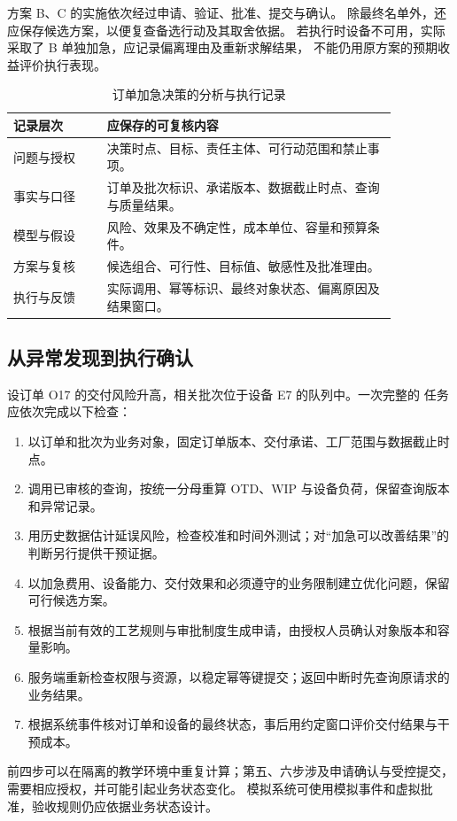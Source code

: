方案 B、C 的实施依次经过申请、验证、批准、提交与确认。
除最终名单外，还应保存候选方案，以便复查备选行动及其取舍依据。
若执行时设备不可用，实际采取了 B 单独加急，应记录偏离理由及重新求解结果，
不能仍用原方案的预期收益评价执行表现。

\begin{table}[htbp]
\centering
\caption{订单加急决策的分析与执行记录}
\label{tab:decision-record}
\begin{tabular}{P{0.21\linewidth}P{0.65\linewidth}}
\toprule
{}
记录层次 & 应保存的可复核内容\\
\midrule
问题与授权 & 决策时点、目标、责任主体、可行动范围和禁止事项。\\
事实与口径 & 订单及批次标识、承诺版本、数据截止时点、查询与质量结果。\\
模型与假设 & 风险、效果及不确定性，成本单位、容量和预算条件。\\
方案与复核 & 候选组合、可行性、目标值、敏感性及批准理由。\\
执行与反馈 & 实际调用、幂等标识、最终对象状态、偏离原因及结果窗口。\\
\bottomrule
\end{tabular}
\end{table}

\subsection{从异常发现到执行确认}
设订单 O17 的交付风险升高，相关批次位于设备 E7 的队列中。一次完整的
任务应依次完成以下检查：
\begin{enumerate}
  \item 以订单和批次为业务对象，固定订单版本、交付承诺、工厂范围与数据截止时点。
  \item 调用已审核的查询，按统一分母重算 OTD、WIP 与设备负荷，保留查询版本和异常记录。
  \item 用历史数据估计延误风险，检查校准和时间外测试；对“加急可以改善结果”的判断另行提供干预证据。
  \item 以加急费用、设备能力、交付效果和必须遵守的业务限制建立优化问题，保留可行候选方案。
  \item 根据当前有效的工艺规则与审批制度生成申请，由授权人员确认对象版本和容量影响。
  \item 服务端重新检查权限与资源，以稳定幂等键提交；返回中断时先查询原请求的业务结果。
  \item 根据系统事件核对订单和设备的最终状态，事后用约定窗口评价交付结果与干预成本。
\end{enumerate}
前四步可以在隔离的教学环境中重复计算；第五、六步涉及申请确认与受控提交，需要相应授权，并可能引起业务状态变化。
模拟系统可使用模拟事件和虚拟批准，验收规则仍应依据业务状态设计。

